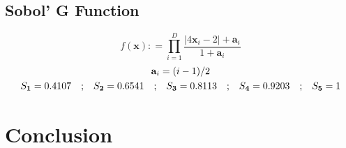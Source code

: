 \documentclass[preprint,12pt]{elsarticle}
\newcommand*{\M}[1]{\ensuremath{#1}\xspace}
\newcommand*{\vr}[1]{\M{\mathbf{#1}}}
\newcommand*{\deq}{\M{\mathrel{\mathop:}=}}
\newcommand{\T}[1]{\text{#1}}
\newcommand*{\QT}[2][]{\M{\quad\T{#2}\ifthenelse{\equal{#1}{}}{\quad}{#1}}}
\newcommand*{\modulus}[1]{\M{\left\lvert#1\right\rvert}}
\begin{document}
            


        \subsection{Sobol' G Function} \label{sub:Results:SobolG}
            \begin{equation} \label{def:SobolG}
                f(\vr{x}) \deq \prod_{i=1}^{D}{\frac{\modulus{4\vr{x}_i - 2} + \vr{a}_{i}}{1+\vr{a}_{i}}}
            \end{equation}
            \begin{gather*}
                \vr{a}_{i} = (i-1)/2 \\
                S_{\vr{1}} = 0.4107 \QT{;}S_{\vr{2}} = 0.6541 \QT{;} S_{\vr{3}} = 0.8113 \QT{;} S_{\vr{4}} = 0.9203 \QT{;} S_{\vr{5}} = 1
            \end{gather*}

            



     \section{Conclusion} \label{sec:Conclusion}







         
    
\end{document}

